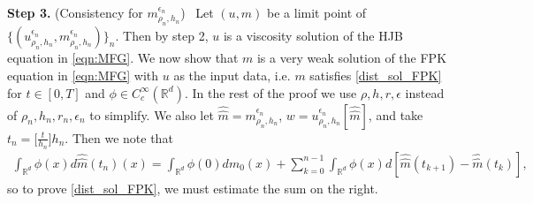 \documentclass[a4paper,  twoside, 10pt, leqno]{amsart}
\newcommand{\rd}{\mathbb{R}^d}
\theoremstyle{remark}
\theoremstyle{definition}
\begin{document}
\noindent \textbf{Step 3.} (Consistency for $m^{\epsilon_n}_{\rho_n,h_n}$) \ Let   $(u,m)$ be a limit point of $\{(u^{\epsilon_n}_{\rho_n,h_n},m^{\epsilon_n}_{\rho_n,h_n})\}_n$. Then by step 2, $u$ is a viscosity solution of the HJB equation in \eqref{eqn:MFG}.
We now   show that $m$ is a very weak solution of the FPK equation in \eqref{eqn:MFG} with $u$ as the input data, i.e. $m$ satisfies \eqref{dist_sol_FPK} 
for $t\in[0,T]$ and $\phi \in C_c^\infty(\rd)$.  In the rest of the proof we use  $\rho, h, r, \epsilon$ instead of $\rho_{n}, h_{n}, r_{n}, \epsilon_n$ to simplify. We also let 
$\widehat{\widehat{m}} = m^{\epsilon_n}_{\rho_n,h_n}$, $w=u_{\rho_n,h_n}^{\epsilon_n}[\widehat{\widehat{m}}]$, and take
$t_n=\big[\frac{t}{h_n}\big]h_n$. Then we note that
\begin{align*}
\int_{\rd}\phi(x)d\widehat{\widehat{m}}(t_n)(x)=\int_{\rd}\phi(0)dm_0(x) + \sum_{k=0}^{n-1}\int_{\rd}\phi(x)d[\widehat{\widehat{m}}(t_{k+1})-\widehat{\widehat{m}}(t_k)],
\end{align*}
so to prove \eqref{dist_sol_FPK}, we must estimate the sum on the right. 
\end{document}

